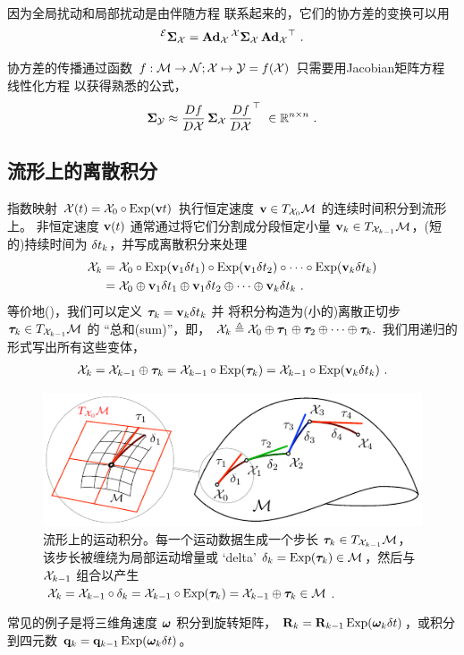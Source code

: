 因为全局扰动和局部扰动是由伴随方程  联系起来的，它们的协方差的变换可以用
%
\begin{align}
^\cE\bfSigma_{\cX} = \Ad[\cM]{\cX} \, ^\cX\bfSigma_{\cX} \, \Ad[\cM]{\cX}\tr
~.
\end{align}

协方差的传播通过函数 $f:\cM\to\cN;\cX\mapsto \cY=f(\cX)$ 只需要用Jacobian矩阵方程  线性化方程  以获得熟悉的公式，
%
\begin{align}\label{equ:cov_propagation}
\bfSigma_{\cY} \approx \ndpar{f}{\cX} \, \bfSigma_\cX \, \ndpar{f}{\cX}\tr
~\in\bbR^{n\times n}
~.
\end{align}



\subsection{流形上的离散积分}

指数映射 $\cX(t)=\cX_0\circ\Exp(\bfv t)$ 执行恒定速度 $\bfv\in\mtanat{\cM}{\cX_0}$ 的连续时间积分到流形上。
非恒定速度 $\bfv(t)$ 通常通过将它们分割成分段恒定小量 $\bfv_k\in\mtanat{\cM}{\cX_{k-1}}$，(短的)持续时间为 $\dt_k$，并写成离散积分来处理
%
\begin{align*}
\cX_k &= \cX_0\circ\Exp(\bfv_1 \dt_1)\circ\Exp(\bfv_1 \dt_2)\circ\cdots\circ\Exp(\bfv_k \dt_k) \\
 &= \cX_0 \op \bfv_1 \dt_1\op\bfv_1 \dt_2\op\cdots\op\bfv_k \dt_k
~.
\end{align*}
%
等价地()，我们可以定义 $\bftau_k=\bfv_k\dt_k$ 并
将积分构造为(小的)离散正切步 $\bftau_k\in\mtanat{\cM}{\cX_{k-1}}$ 的 ``总和(sum)''，即，
%
$
\cX_k \te \cX_0\op\bftau_1\op\bftau_2\op\cdots\op\bftau_k.
$
%
我们用递归的形式写出所有这些变体，
%
\begin{align}\label{equ:int_recursive}
\cX_k = \cX_{k-1}\op\bftau_k = \cX_{k-1}\circ\Exp(\bftau_k) = \cX_{k-1}\circ\Exp(\bfv_k\dt_k)
~.
\end{align}
%

\begin{figure}[tb]
\centering
\includegraphics{figures/manifold_int}
\caption{流形上的运动积分。每一个运动数据生成一个步长 $\bftau_k\in\mtanat{\cM}{\cX_{k-1}}$，该步长被缠绕为局部运动增量或 `delta' $\delta_k=\Exp(\bftau_k)\in\cM$，然后与 $\cX_{k-1}$ 组合以产生 $\cX_k=\cX_{k-1}\circ\delta_k=\cX_{k-1}\circ\Exp(\bftau_k)=\cX_{k-1}\op\bftau_k\in\cM$.}
\label{fig:manifold_int}
\end{figure}%

常见的例子是将三维角速度 $\bfomega$ 积分到旋转矩阵， $\bfR_k=\bfR_{k-1}\Exp(\bfomega_k\dt)$，或积分到四元数 $\bfq_k=\bfq_{k-1}\Exp(\bfomega_k\dt)$。

